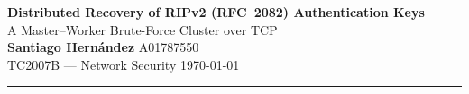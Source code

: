 \begin{center}
    {\LARGE\textbf{Distributed Recovery of RIPv2 (RFC~2082) Authentication Keys}}\\[2mm]
    {\large A Master--Worker Brute-Force Cluster over TCP}\\[3mm]
    \textbf{Santiago Hernández} \quad A01787550\\[1mm]
    TC2007B --- Network Security \quad\textbullet\quad \today\\
\end{center}
\hrule
\vspace{3mm}
